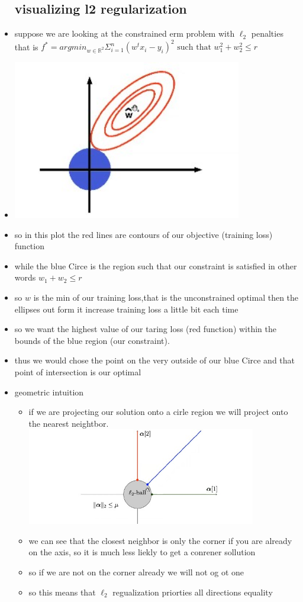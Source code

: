 \documentclass{article}
\begin{document}
\begin{itemize}
\subsection{visualizing l2 regularization}
\item suppose we are looking at the constrained erm problem with $\ell_{2}$ penalties that is $f^{*}=argmin_{w\in \mathbb{R}^{2}} \Sigma_{i=1}^{n}(w^{t}x_i-y_i)^{2}\text{ such that } w_1^2+w_2^2\leq r$ 
\item \includegraphics[width=10cm]{lecture_notes/lecture_3/immages/l3_6.jpg}
\item so in this plot the red lines are contours of our objective (training loss) function 
\item while the blue Circe is the region such that our constraint is satisfied in other words $w_1+w_2\leq r$
\item so $\hat{w}$ is the min of our training loss,that is the unconstrained optimal then the ellipses out form it increase training loss a little bit each time 
\item so we want the highest value of our taring loss (red function) within the bounds of the blue region (our constraint). 
\item thus we would chose the point on the very outside of our blue Circe and that point of intersection is our optimal
\item geometric intuition 
\begin{itemize}
    \item if we are projecting our solution onto a cirle region we will project onto the nearest neightbor. 
    \includegraphics[width=10cm]{lecture_notes/lecture_3/immages/l3_9.jpg}
    \item we can see that the closest neighbor is only the corner if you are already on the axis, so it is much less liekly to get a conrener sollution 
    \item so if we are not on the corner already we will not og ot one 
    \item so this means that $\ell_{2}$ regualization priorties all directions equality
\end{itemize}


\end{itemize}
\end{document}
